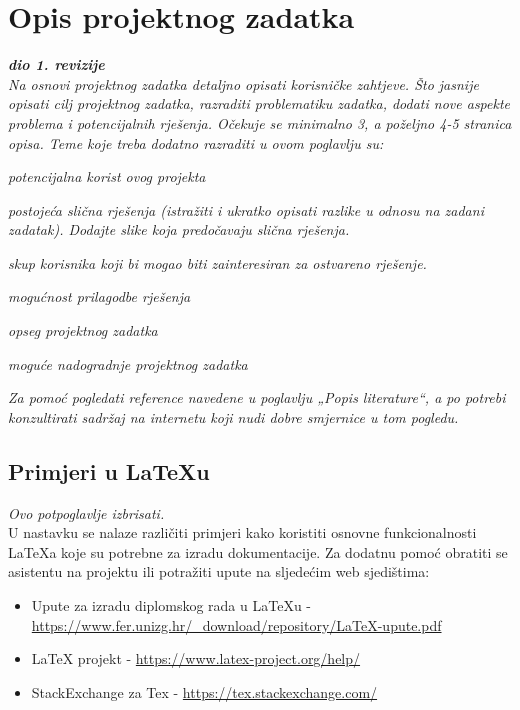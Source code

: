 \chapter{Opis projektnog zadatka}
		
		
		\textbf{\textit{dio 1. revizije}}\\
		
		\textit{Na osnovi projektnog zadatka detaljno opisati korisničke zahtjeve. Što jasnije opisati cilj projektnog zadatka, razraditi problematiku zadatka, dodati nove aspekte problema i potencijalnih rješenja. Očekuje se minimalno 3, a poželjno 4-5 stranica opisa.	Teme koje treba dodatno razraditi u ovom poglavlju su:}
		\begin{packed_item}
			\item \textit{potencijalna korist ovog projekta}
			\item \textit{postojeća slična rješenja (istražiti i ukratko opisati razlike u odnosu na zadani zadatak). Dodajte slike koja predočavaju slična rješenja.}
			\item \textit{skup korisnika koji bi mogao biti zainteresiran za ostvareno rješenje.}
			\item \textit{mogućnost prilagodbe rješenja }
			\item \textit{opseg projektnog zadatka}
			\item \textit{moguće nadogradnje projektnog zadatka}
		\end{packed_item}
		
		\textit{Za pomoć pogledati reference navedene u poglavlju „Popis literature“, a po potrebi konzultirati sadržaj na internetu koji nudi dobre smjernice u tom pogledu.}
		\eject
		
		\section{Primjeri u LaTeXu}
		
		\textit{Ovo potpoglavlje izbrisati.}\\

		U nastavku se nalaze različiti primjeri kako koristiti osnovne funkcionalnosti LaTeXa koje su potrebne za izradu dokumentacije. Za dodatnu pomoć obratiti se asistentu na projektu ili potražiti upute na sljedećim web sjedištima:
		\begin{itemize}
			\item Upute za izradu diplomskog rada u LaTeXu - \url{https://www.fer.unizg.hr/_download/repository/LaTeX-upute.pdf}
			\item LaTeX projekt - \url{https://www.latex-project.org/help/}
			\item StackExchange za Tex - \url{https://tex.stackexchange.com/}\\
		
		\end{itemize} 	


